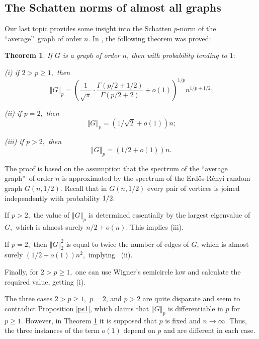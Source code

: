 \documentclass[12pt]{article}%
\newtheorem{theorem}{Theorem}[section]
\begin{document}
\subsection{\label{sec1.1}The Schatten norms of almost all graphs}

Our last topic provides some insight into the Schatten $p$-norm of the
\textquotedblleft average\textquotedblright\ graph of order $n$. In
\cite{Nik12}, the following theorem was proved:

\begin{theorem}
\label{Rands}If $G$ is a graph of order $n$, then with probability tending to
$1:$

(i) if $2>p\geq1,$ then
\begin{equation}
\left\Vert G\right\Vert _{p}=\left(  \frac{1}{\sqrt{\pi}}\cdot\frac
{\Gamma\left(  p/2+1/2\right)  }{\Gamma\left(  p/2+2\right)  }+o\left(
1\right)  \right)  ^{1/p}n^{1/p+1/2}\text{;} \label{wig}%
\end{equation}


(ii) if $p=2,$ then%
\[
\left\Vert G\right\Vert _{p}=\left(  1/\sqrt{2}+o\left(  1\right)  \right)
n\text{;}%
\]


(iii) if $p>2,$ then%
\[
\left\Vert G\right\Vert _{p}=\left(  1/2+o\left(  1\right)  \right)  n.
\]

\end{theorem}

The proof is based on the assumption that the spectrum of the
\textquotedblleft average graph\textquotedblright\ of order $n$ is
approximated by the spectrum of the Erd\H{o}s-R\'{e}nyi random graph $G\left(
n,1/2\right)  .$ Recall that in $G\left(  n,1/2\right)  $ every pair of
vertices is joined independently with probability $1/2.\medskip$

If $p>2,$ the value of $\left\Vert G\right\Vert _{p}$ is determined
essentially by the largest eigenvalue of $G,$ which is almost surely
$n/2+o\left(  n\right)  .$ This implies (iii).

If $p=2,$ then $\left\Vert G\right\Vert _{2}^{2}$ is equal to twice the number
of edges of $G$, which is almost surely $\left(  1/2+o\left(  1\right)
\right)  n^{2},$ implying \ (ii)$.$

Finally, for $2>p\geq1,$ one can use Wigner's semicircle law and calculate the
required value, getting (i).\medskip

The three cases $2>p\geq1,$ $p=2$, and $p>2$ are quite disparate and seem to
contradict Proposition \ref{ps1}, which claims that $\left\Vert G\right\Vert
_{p}$ is differentiable in $p$ for $p\geq1.$ However, in Theorem \ref{Rands}
it is supposed that $p$ is fixed and $n\rightarrow\infty.$ Thus, the three
instances of the term $o\left(  1\right)  $ depend on $p$ and are different in
each case.\medskip
\end{document}

